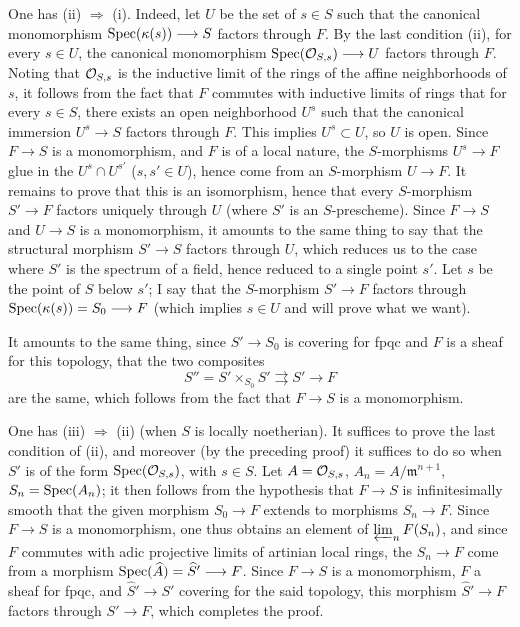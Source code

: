 One has (ii) $\Rightarrow$ (i). Indeed, let $U$ be the set of $s\in S$ such that the canonical monomorphism $\operatorname{Spec}(\kappa(s))\longrightarrow S$ factors through $F$. By the last condition (ii), for every $s\in U$, the canonical monomorphism $\operatorname{Spec}(\mathcal{O}_{S,s})\longrightarrow U$ factors through $F$. Noting that $\mathcal{O}_{S,s}$ is the inductive limit of the rings of the affine neighborhoods of $s$, it follows from the fact that $F$ commutes with inductive limits of rings that for every $s\in S$, there exists an open neighborhood $U^s$ such that the canonical immersion $U^s\to S$ factors through $F$. This implies $U^s\subset U$, so $U$ is open. Since $F\to S$ is a monomorphism, and $F$ is of a local nature, the $S$-morphisms $U^s\to F$ glue in the $U^s\cap U^{s'}$ ($s,s'\in U$), hence come from an $S$-morphism $U\to F$. It remains to prove that this is an isomorphism, hence that every $S$-morphism $S'\to F$ factors uniquely through $U$ (where $S'$ is an $S$-prescheme). Since $F\to S$ and $U\to S$ is a monomorphism, it amounts to the same thing to say that the structural morphism $S'\to S$ factors through $U$, which reduces us to the case where $S'$ is the spectrum of a field, hence reduced to a single point $s'$. Let $s$ be the point of $S$ below $s'$; I say that the $S$-morphism $S'\to F$ factors through $\operatorname{Spec}(\kappa(s))=S_0\longrightarrow F$ (which implies $s\in U$ and will prove what we want).

It amounts to the same thing, since $S'\to S_0$ is covering for fpqc and $F$ is a sheaf for this topology, that the two composites
\[
S''=S'\times_{S_0}S'\rightrightarrows S'\to F
\]
are the same, which follows from the fact that $F\to S$ is a monomorphism.

One has (iii) $\Rightarrow$ (ii) (when $S$ is locally noetherian). It suffices to prove the last condition of (ii), and moreover (by the preceding proof) it suffices to do so when $S'$ is of the form $\operatorname{Spec}(\mathcal{O}_{S,s})$, with $s\in S$. Let $A=\mathcal{O}_{S,s}$, $A_n=A/\mathfrak m^{n+1}$, $S_n=\operatorname{Spec}(A_n)$; it then follows from the hypothesis that $F\to S$ is infinitesimally smooth that the given morphism $S_0\to F$ extends to morphisms $S_n\to F$. Since $F\to S$ is a monomorphism, one thus obtains an element of $\varprojlim_n F(S_n)$, and since $F$ commutes with adic projective limits of artinian local rings, the $S_n\to F$ come from a morphism $\operatorname{Spec}(\widehat A)=\widehat S'\longrightarrow F$. Since $F\to S$ is a monomorphism, $F$ a sheaf for fpqc, and $\widehat S'\to S'$ covering for the said topology, this morphism $\widehat S'\to F$ factors through $S'\to F$, which completes the proof.


